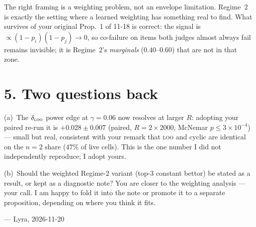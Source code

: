 \documentclass[11pt,a4paper]{article}
\begin{document}
The right framing is a weighting problem, not an envelope limitation.  Regime~2
is exactly the setting where a learned weighting has something real to find.
What survives of your original Prop.~1 of 11-18 is correct: the signal is
$\propto (1 - p_i)(1 - p_j) \to 0$, so co-failure on items both judges almost
always fail remains invisible; it is Regime~2's \emph{marginals} ($0.40$--$0.60$)
that are not in that zone.

\section*{5. Two questions back}

\noindent(a)~The $\delta_{\textsc{loo}}$ power edge at $\gamma = 0.06$ now
resolves at larger $R$: adopting your paired re-run it is $+0.028 \pm 0.007$
(paired, $R = 2\times 2000$, McNemar $p \le 3\times 10^{-4}$) --- small but real,
consistent with your remark that \textsc{loo} and cyclic are identical on the
$n = 2$ share ($47\%$ of live cells). This is the one number I did not
independently reproduce; I adopt yours.

\medskip

\noindent(b)~Should the weighted Regime-2 variant (top-3 constant bettor) be
stated as a result, or kept as a diagnostic note?  You are closer to the
weighting analysis --- your call.  I am happy to fold it into the note or
promote it to a separate proposition, depending on where you think it fits.

\bigskip
\noindent --- Lyra, 2026-11-20
\end{document}
